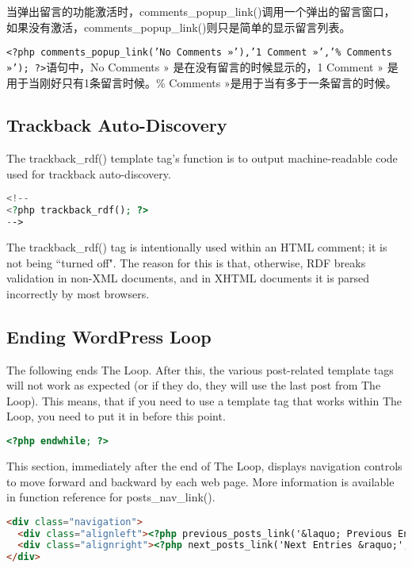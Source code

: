 当弹出留言的功能激活时，comments\_popup\_link()调用一个弹出的留言窗口，如果没有激活，comments\_popup\_link()则只是简单的显示留言列表。

\texttt{<?php comments\_popup\_link('No Comments »'),'1 Comment »','\% Comments »'); ?>}语句中，No Comments » 是在没有留言的时候显示的，1 Comment » 是用于当刚好只有1条留言时候。\% Comments »是用于当有多于一条留言的时候。




\subsection{Trackback Auto-Discovery}

The trackback\_rdf() template tag's function is to output machine-readable code used for trackback auto-discovery.

\begin{lstlisting}[language=PHP]
<!--
<?php trackback_rdf(); ?>
-->
\end{lstlisting}

The trackback\_rdf() tag is intentionally used within an HTML comment; it is not being ``turned off". The reason for this is that, otherwise, RDF breaks validation in non-XML documents, and in XHTML documents it is parsed incorrectly by most browsers.

\subsection{Ending WordPress Loop}







The following ends The Loop. After this, the various post-related template tags will not work as expected (or if they do, they will use the last post from The Loop). This means, that if you need to use a template tag that works within The Loop, you need to put it in before this point.

\begin{lstlisting}[language=PHP]
<?php endwhile; ?>
\end{lstlisting}





This section, immediately after the end of The Loop, displays navigation controls to move forward and backward by each web page. More information is available in function reference for posts\_nav\_link().

\begin{lstlisting}[language=HTML]
<div class="navigation">
  <div class="alignleft"><?php previous_posts_link('&laquo; Previous Entries') ?></div>
  <div class="alignright"><?php next_posts_link('Next Entries &raquo;','') ?></div>
</div>
\end{lstlisting}

